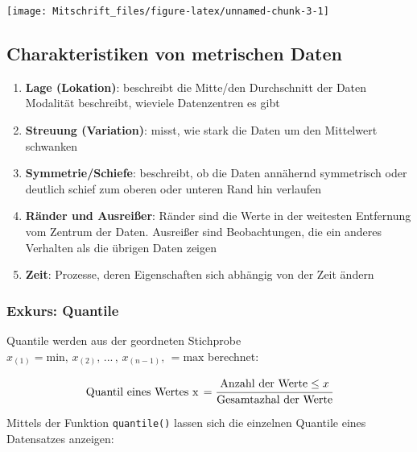 \documentclass[
]{article}
\begin{document}
\begin{center}\texttt{[image: Mitschrift\_files/figure-latex/unnamed-chunk-3-1]} \end{center}

\hypertarget{charakteristiken-von-metrischen-daten}{%
\subsection{Charakteristiken von metrischen
Daten}\label{charakteristiken-von-metrischen-daten}}

\tcolorbox

\begin{enumerate}
\def\labelenumi{\arabic{enumi}.}
\item
  \textbf{Lage (Lokation)}: beschreibt die Mitte/den Durchschnitt der
  Daten Modalität beschreibt, wieviele Datenzentren es gibt
\item
  \textbf{Streuung (Variation)}: misst, wie stark die Daten um den
  Mittelwert schwanken
\item
  \textbf{Symmetrie/Schiefe}: beschreibt, ob die Daten annähernd
  symmetrisch oder deutlich schief zum oberen oder unteren Rand hin
  verlaufen
\item
  \textbf{Ränder und Ausreißer}: Ränder sind die Werte in der weitesten
  Entfernung vom Zentrum der Daten. Ausreißer sind Beobachtungen, die
  ein anderes Verhalten als die übrigen Daten zeigen
\item
  \textbf{Zeit}: Prozesse, deren Eigenschaften sich abhängig von der
  Zeit ändern
\end{enumerate}

\endtcolorbox

\hypertarget{exkurs-quantile}{%
\subsubsection{Exkurs: Quantile}\label{exkurs-quantile}}

\tcolorbox

Quantile werden aus der geordneten Stichprobe
\(x_{(1)} = \text{min}, \, x_{(2)}, \, ... \, , \, x_{(n-1)}, \, = \text{max}\)
berechnet:

\[\text{Quantil eines Wertes x} \, = \cfrac{\text{Anzahl der Werte} \leq x}{\text{Gesamtazhal der Werte}}\]
\endtcolorbox

Mittels der Funktion \texttt{quantile()} lassen sich die einzelnen
Quantile eines Datensatzes anzeigen:
\end{document}
